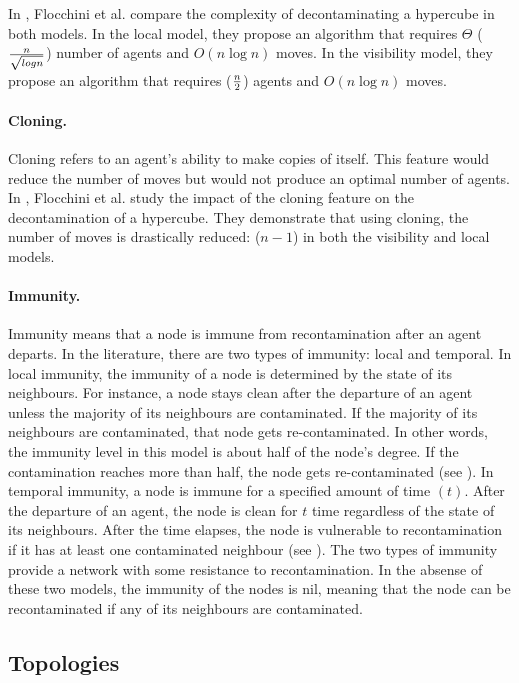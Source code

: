  In \cite{floetal20}, Flocchini et al. compare the complexity of  decontaminating a hypercube in both models. In the local model, they propose an algorithm that requires  $\Theta$  ($n \over { \sqrt {log n}} $) number of agents and  $O(n \log n)$  moves. In the  visibility model, they propose an algorithm that requires ($n\over2$) agents and $O(n \log n)$ moves.



\paragraph{ Cloning.}
Cloning refers to an agent's ability to make copies of itself. This feature would reduce the number of moves but would not produce an optimal number of agents. In \cite{floetal20}, Flocchini et al. study the impact of the cloning feature on the decontamination of a hypercube. They demonstrate that using cloning, the number of moves is drastically reduced: ($n-1$) in both the visibility and local models.


\paragraph{ Immunity.}
Immunity means that a node is immune from recontamination after an agent departs. In the literature, there are two types of immunity: local and temporal. In local immunity, the immunity of a node is determined by the state of its neighbours. For instance, a node stays clean after the departure of an agent unless the majority of its neighbours are contaminated. If the majority of its neighbours are contaminated, that node gets re-contaminated. In other words, the immunity level in this model is about half of the node’s degree. If the contamination reaches more than half, the node gets re-contaminated (see \cite{lucetal22,floc21}). In temporal immunity, a node is immune for a specified amount of time $(t)$. After the departure of an agent, the node is clean for $t$ time regardless of the state of its neighbours. After the time elapses, the node is vulnerable to recontamination if it has at least one contaminated neighbour (see \cite{floetal13}). The two types of immunity provide a network with some resistance to recontamination.  In the absense of these two models, the immunity of the nodes is nil, meaning that the node can be recontaminated if any of its neighbours are contaminated.



\subsection{Topologies}

